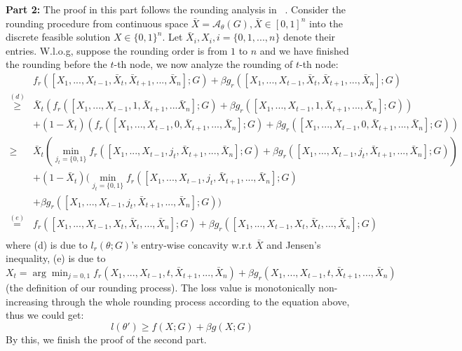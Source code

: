 \textbf{Part 2:} The proof in this part follows the rounding analysis in ~\cite{wang2022unsupervised}. Consider the rounding procedure from continuous space $\bar{X} = \mathcal{A}_{\theta}(G), \bar{X} \in [0,1]^n$ into the discrete feasible solution $X \in \{0,1\}^n$. Let $\bar{X}_i, X_i, i = \{0,1,...,n\}$ denote their entries. W.l.o.g, suppose the rounding order is from $1$ to $n$ and we have finished the rounding before the $t$-th node, we now analyze the rounding of $t$-th node:
\begin{equation}
\begin{aligned}
    & f_r([X_1,...,X_{t-1},\bar{X}_t,\bar{X}_{t+1},...,\bar{X}_n];G) + \beta g_r([X_1,...,X_{t-1},\bar{X}_t,\bar{X}_{t+1},...,\bar{X}_n];G) \\
      \stackrel{(d)}{\geq} & \bar{X}_t ( f_r([X_1,...,X_{t-1},1,\bar{X}_{t+1},...\bar{X}_n];G) + \beta g_r([X_1,...,X_{t-1},1,\bar{X}_{t+1},...,\bar{X}_n];G)) \\
    & + (1-\bar{X}_t) ( f_r([X_1,...,X_{t-1},0,\bar{X}_{t+1},...,\bar{X}_n];G) + \beta g_r([X_1,...,X_{t-1},0,\bar{X}_{t+1},...,\bar{X}_n];G)) \\
    \geq & \bar{X}_t ( \min_{j_t=\{0,1\}}f_r([X_1,...,X_{t-1},j_t,\bar{X}_{t+1},...,\bar{X}_n];G) + \beta g_r([X_1,...,X_{t-1},j_t,\bar{X}_{t+1},...,\bar{X}_n];G)) \\
    & + (1-\bar{X}_t) (\min_{j_t=\{0,1\}} f_r([X_1,...,X_{t-1},j_t,\bar{X}_{t+1},...,\bar{X}_n];G) \\
    &+ \beta g_r([X_1,...,X_{t-1},j_t,\bar{X}_{t+1},...,\bar{X}_n];G)) \\
     \stackrel{(e)}{=} & f_r([X_1,...,X_{t-1},X_t,\bar{X}_t,...,\bar{X}_n];G) + \beta g_r([X_1,...,X_{t-1},X_t,\bar{X}_t,...,\bar{X}_n];G) \\
\end{aligned}
\end{equation}
where (d) is due to $l_r(\theta;G)$'s entry-wise concavity w.r.t $\bar{X}$ and Jensen's inequality, (e) is due to $X_t = \arg\min_{j=0,1} f_r(X_1,...,X_{t-1},t,\bar{X}_{t+1},...,\bar{X}_n)+\beta g_r(X_1,...,X_{t-1},t,\bar{X}_{t+1},...,\bar{X}_n)$ (the definition of our rounding process). The loss value is monotonically non-increasing through the whole rounding process according to the equation above, thus we could get:
\begin{equation}
    l(\theta') \geq f(X;G) + \beta g(X;G)
\end{equation}
By this, we finish the proof of the second part.

